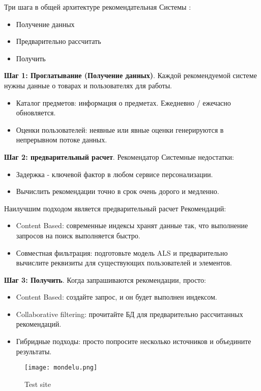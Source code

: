 Три шага в общей архитектуре рекомендательная Системы :
\begin{itemize}
	\item Получение данных
	\item  Предварительно рассчитать
	\item  Получить
\end{itemize}


\textbf{Шаг 1: Проглатывание (Получение данных)}. 
Каждой рекомендуемой системе нужны данные о товарах и пользователях для работы.
\begin{itemize}
	\item Каталог предметов: информация о предметах. Ежедневно / ежечасно обновляется.
	\item Оценки пользователей: неявные или явные оценки генерируются в непрерывном потоке данных.
\end{itemize}


\textbf{Шаг 2: предварительный расчет}.
Рекомендатор Системные недостатки:
\begin{itemize}
	\item Задержка - ключевой фактор в любом сервисе персонализации.
	\item Вычислить рекомендации точно в срок очень дорого и медленно.
\end{itemize}

Наилучшим подходом является предварительный расчет Рекомендаций:
\begin{itemize}
	\item Content Based: современные индексы хранят данные так, что выполнение запросов на поиск выполняется быстро.
	\item Совместная фильтрация: подготовьте модель ALS и предварительно вычислите реквизиты для существующих пользователей и элементов.
\end{itemize}

\textbf{Шаг 3: Получить}. 
Когда запрашиваются рекомендации, просто:
\begin{itemize}
	\item Content Based: создайте запрос, и он будет выполнен индексом.
	\item Collaborative filtering: прочитайте БД для предварительно рассчитанных рекомендаций.
	\item Гибридные подходы: просто попросите несколько источников и объедините результаты.
\end{itemize}



\begin{figure}[h]
  \centering
  \texttt{[image: mondelu.png]}
  \caption{Test site}
  \label{image:alg_timer3}
\end{figure}


